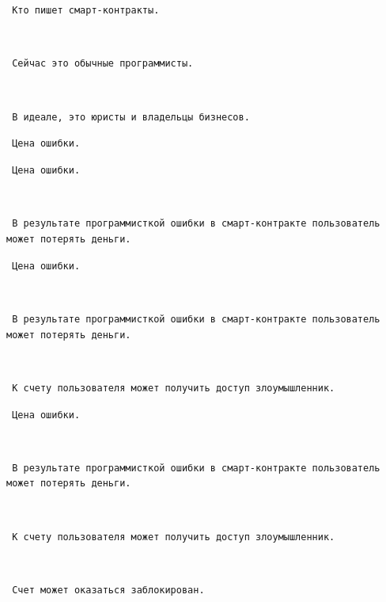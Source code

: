 \documentclass[11pt,handout,pdf,hyperref={unicode}]{beamer}
\begin{document}
\begin{frame}[fragile]

\texttt{ Кто пишет смарт-контракты. }

\texttt{ }

\texttt{ Сейчас это обычные программисты. }

\texttt{ }

\texttt{ В идеале, это юристы и владельцы бизнесов. }

\end{frame}

\begin{frame}[fragile]

\texttt{ Цена ошибки. }

\end{frame}

\begin{frame}[fragile]

\texttt{ Цена ошибки. }

\texttt{ }

\texttt{ В результате программисткой ошибки в смарт-контракте пользователь может потерять деньги. }

\end{frame}

\begin{frame}[fragile]

\texttt{ Цена ошибки. }

\texttt{ }

\texttt{ В результате программисткой ошибки в смарт-контракте пользователь может потерять деньги. }

\texttt{ }

\texttt{ К счету пользователя может получить доступ злоумышленник. }

\end{frame}

\begin{frame}[fragile]

\texttt{ Цена ошибки. }

\texttt{ }

\texttt{ В результате программисткой ошибки в смарт-контракте пользователь может потерять деньги. }

\texttt{ }

\texttt{ К счету пользователя может получить доступ злоумышленник. }

\texttt{ }

\texttt{ Счет может оказаться заблокирован. }

\end{frame}
\end{document}
